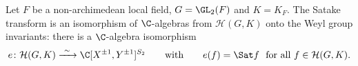 Let $F$ be a non-archimedean local field, $G=\GL_2(F)$ and $K=K_F$. The Satake transform is an isomorphism of
$\C$-algebras from $\mathcal H(G,K)$ onto the Weyl group invariants: there is a $\C$-algebra isomorphism
\[
  e\colon\mathcal H(G,K)\xrightarrow{\ \sim\ }\C[X^{\pm1},Y^{\pm1}]^{S_2}\qquad\text{with}\qquad e(f)=\Sat f\ \text{ for all }f\in\mathcal H(G,K).
\]
